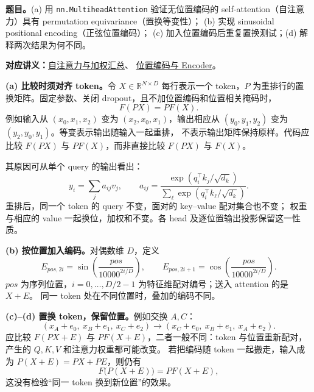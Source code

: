
\begingroup
\renewcommand{\recordid}[1]{}
\renewcommand{\relatedtopic}[2]{\hyperref[topic:#1]{#2}}
\label{tutorial:SC4001-TUT09}

\nopagebreak[4]
\textbf{题目。}(a) 用 \texttt{nn.MultiheadAttention} 验证无位置编码的
self-attention（自注意力）具有 permutation equivariance（置换等变性）；
(b) 实现 sinusoidal positional encoding（正弦位置编码）；
(c) 加入位置编码后重复置换测试；(d) 解释两次结果为何不同。

\textbf{对应讲义：}\relatedtopic{SC4001-L09-T02}{自注意力与加权汇总}、
\relatedtopic{SC4001-L09-T03}{位置编码与 Encoder}。

\textbf{(a) 比较时须对齐 token。}令 $X\in\mathbb R^{N\times D}$ 每行表示一个
token，$P$ 为重排行的置换矩阵。固定参数、关闭 dropout，且不加位置编码和位置相关掩码时，
\[
 \boxed{F(PX)=PF(X).}
\]
例如输入从 $(x_0,x_1,x_2)$ 变为 $(x_2,x_0,x_1)$，输出相应从
$(y_0,y_1,y_2)$ 变为 $(y_2,y_0,y_1)$。等变表示输出随输入一起重排，
不表示输出矩阵保持原样。代码应比较 $F(PX)$ 与 $PF(X)$，而非直接比较 $F(PX)$ 与 $F(X)$。

其原因可从单个 query 的输出看出：
\[
 y_i=\sum_j a_{ij}v_j,\qquad
 a_{ij}=\frac{\exp(q_i^\top k_j/\sqrt{d_k})}
 {\sum_\ell\exp(q_i^\top k_\ell/\sqrt{d_k})}.
\]
重排后，同一个 token 的 query 不变，面对的 key--value 配对集合也不变；
权重与相应的 value 一起换位，加权和不变。各 head 及逐位置输出投影保留这一性质。

\textbf{(b) 按位置加入编码。}对偶数维 $D$，定义
\[
 E_{pos,2i}=\sin\!\left(\frac{pos}{10000^{2i/D}}\right),\qquad
 E_{pos,2i+1}=\cos\!\left(\frac{pos}{10000^{2i/D}}\right).
\]
$pos$ 为序列位置，$i=0,\ldots,D/2-1$ 为特征维配对编号；送入 attention 的是 $X+E$。
同一 token 处在不同位置时，叠加的编码不同。

\textbf{(c)--(d) 置换 token，保留位置。}例如交换 $A,C$：
\[
 (x_A+e_0,\ x_B+e_1,\ x_C+e_2)
 \longrightarrow
 (x_C+e_0,\ x_B+e_1,\ x_A+e_2).
\]
应比较 $F(PX+E)$ 与 $PF(X+E)$，二者一般不同：token 与位置重新配对，
产生的 $Q,K,V$ 和注意力权重都可能改变。
若把编码随 token 一起搬走，输入成为 $P(X+E)=PX+PE$，则仍有
\[
 F\bigl(P(X+E)\bigr)=PF(X+E),
\]
这没有检验“同一 token 换到新位置”的效果。

